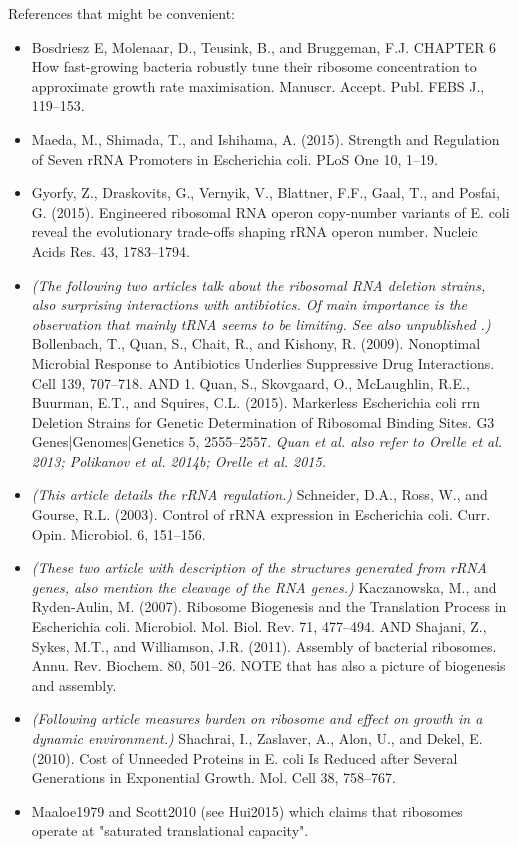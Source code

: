 {    References that might be convenient:
    \begin{itemize}
        \item Bosdriesz E, Molenaar, D., Teusink, B., and Bruggeman, F.J. CHAPTER 6 How fast-growing bacteria robustly tune their ribosome concentration to approximate growth rate maximisation. Manuscr. Accept. Publ. FEBS J., 119–153.
        \cite{BosdrieszE}
        \item Maeda, M., Shimada, T., and Ishihama, A. (2015). Strength and Regulation of Seven rRNA Promoters in Escherichia coli. PLoS One 10, 1–19. \cite{Maeda2015}
        \item Gyorfy, Z., Draskovits, G., Vernyik, V., Blattner, F.F., Gaal, T., and Posfai, G. (2015). Engineered ribosomal RNA operon copy-number variants of E. coli reveal the evolutionary trade-offs shaping rRNA operon number. Nucleic Acids Res. 43, 1783–1794. \cite{Gyorfy2015}
        \item \textit{(The following two articles talk about the ribosomal RNA deletion strains, also surprising interactions with antibiotics. Of main importance is the observation that mainly tRNA seems to be limiting. See also unpublished \cite{Quan2013}.)} Bollenbach, T., Quan, S., Chait, R., and Kishony, R. (2009). Nonoptimal Microbial Response to Antibiotics Underlies Suppressive Drug Interactions. Cell 139, 707–718. \cite{Bollenbach2009} AND 1. Quan, S., Skovgaard, O., McLaughlin, R.E., Buurman, E.T., and Squires, C.L. (2015). Markerless Escherichia coli rrn Deletion Strains for Genetic Determination of Ribosomal Binding Sites. G3 Genes|Genomes|Genetics 5, 2555–2557. \cite{Quan2015} \textit{Quan et al. also refer to Orelle et al. 2013; Polikanov et al. 2014b; Orelle et al. 2015.}
        \item \textit{(This article details the rRNA regulation.)} Schneider, D.A., Ross, W., and Gourse, R.L. (2003). Control of rRNA expression in Escherichia coli. Curr. Opin. Microbiol. 6, 151–156. \cite{Schneider2003} 
        \item \textit{(These two article with description of the structures generated from rRNA genes, also mention the cleavage of the RNA genes.)}  Kaczanowska, M., and Ryden-Aulin, M. (2007). Ribosome Biogenesis and the Translation Process in Escherichia coli. Microbiol. Mol. Biol. Rev. 71, 477–494. \cite{Kaczanowska2007} AND Shajani, Z., Sykes, M.T., and Williamson, J.R. (2011). Assembly of bacterial ribosomes. Annu. Rev. Biochem. 80, 501–26. \cite{Shajani2011}
        NOTE that \cite{Chen2013} has also a picture of biogenesis and assembly.
        \item \textit{(Following article measures burden on ribosome and effect on growth in a dynamic environment.)} Shachrai, I., Zaslaver, A., Alon, U., and Dekel, E. (2010). Cost of Unneeded Proteins in E. coli Is Reduced after Several Generations in Exponential Growth. Mol. Cell 38, 758–767.        
        \cite{Shachrai2010}
        \item Maaloe1979 and Scott2010 (see Hui2015) which claims that ribosomes operate at "saturated translational capacity".
    \end{itemize} 
    
\clearpage    
}
















